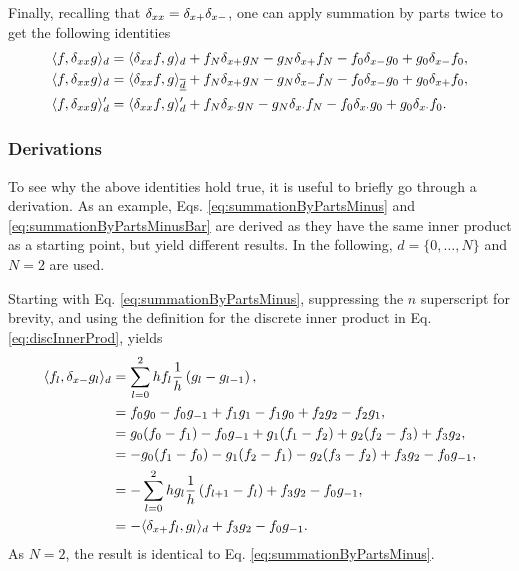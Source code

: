 Finally, recalling that $\delta_{xx} = \delta_{x+}\delta_{x-}$, one can apply summation by parts twice to get the following identities
\begin{subequations}
    \begin{align}
        \langle f, \delta_{xx} g\rangle_d &= \langle \delta_{xx}f, g \rangle_d+f_N\delta_{x+}g_N-g_N\delta_{x+}f_N -f_0\delta_{x-}g_0+g_0\delta_{x-}f_0,\label{eq:summationsummationByPartsTwice}\\
        \langle f, \delta_{xx} g\rangle_d &= \langle \delta_{xx}f, g \rangle_{\underline{\overline{d}}}+f_N\delta_{x+} g_N-g_N\delta_{x-} f_N -f_0\delta_{x-} g_0+g_0\delta_{x+} f_0,\label{eq:summationByPartsTwiceReduced}\\
        \langle f, \delta_{xx} g\rangle_d' &= \langle \delta_{xx} f, g\rangle_d' + f_N\delta_{x\cdot} g_N - g_N \delta_{x\cdot} f_N - f_0 \delta_{x\cdot} g_0 + g_0 \delta_{x\cdot} f_0.\label{eq:summationByPartsTwicePrimed}
    \end{align}
\end{subequations}

\subsubsection{Derivations}
To see why the above identities hold true, it is useful to briefly go through a derivation. As an example, Eqs. \eqref{eq:summationByPartsMinus} and \eqref{eq:summationByPartsMinusBar} are derived as they have the same inner product as a starting point, but yield different results. In the following, $d=\{0, \hdots, N\}$ and $N = 2$ are used. 

Starting with Eq. \eqref{eq:summationByPartsMinus}, suppressing the $n$ superscript for brevity, and using the definition for the discrete inner product in Eq. \eqref{eq:discInnerProd}, yields
\begin{align*}
    \langle f_l, \delta_{x-} g_l \rangle_d &= \sum_{l = 0}^2 h f_l\frac{1}{h}\left(g_l - g_{l-1}\right),\\
    &= f_0g_0 - f_0g_{-1} + f_1g_1 - f_1g_0 + f_2g_2-f_2g_1,\\
    &= g_0(f_0-f_1) - f_0g_{-1} + g_1(f_1-f_2) + g_2(f_2-f_3) + f_3g_2,\\
    &= -g_0(f_1-f_0)- g_1(f_2-f_1) - g_2(f_3-f_2) + f_3g_2 - f_0g_{-1},\\
    &= -\sum_{l=0}^2 h g_l\frac{1}{h}\left(f_{l+1} - f_l\right) + f_3g_2 - f_0g_{-1},\\
    &= -\langle \delta_{x+} f_l, g_l\rangle_d + f_3g_2 - f_0g_{-1}.
\end{align*}
As $N=2$, the result is identical to Eq. \eqref{eq:summationByPartsMinus}. 

